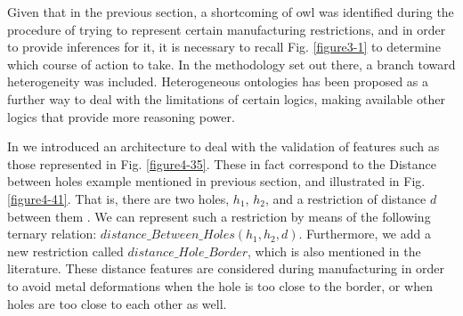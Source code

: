 Given that in the previous section, a shortcoming of \gls{owl} was identified during the procedure of trying to represent certain manufacturing restrictions, and in order to provide inferences for it, it is necessary to recall  Fig. \ref{figure3-1} to determine which course of action to take. In the methodology set out there, a branch toward heterogeneity was included. Heterogeneous ontologies has been proposed as a further way to deal with the limitations of certain logics, making available other logics that provide more reasoning power.


In \cite{ramos_hetereogeneous_2012}   we introduced an architecture to deal with the validation of features such as those represented in Fig. \ref{figure4-35}. These in fact correspond to the Distance between holes example mentioned in previous section, and illustrated in Fig. \ref{figure4-41}. That is, there are two holes, $h_{1}$, $h_{2}$, and a restriction of distance $d$ between them . We can represent such a restriction by means of the following ternary relation: $distance\_Between\_Holes(h_{1},h_{2},d)$.  Furthermore, we add a new restriction   called $distance\_Hole\_Border$, which is also mentioned in the literature. These distance features are considered during manufacturing in order to avoid metal deformations when the hole is too close to the border, or when holes are too close to each other as well. 


